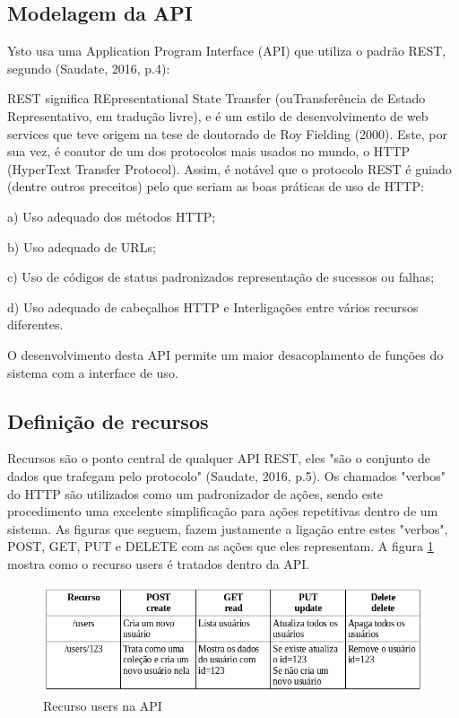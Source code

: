 \subsection{Modelagem da API}
Ysto usa uma Application Program Interface (API) que utiliza o padrão REST, segundo (Saudate, 2016, p.4):

\begin{citacao}
REST significa REpresentational State Transfer (ouTransferência de Estado Representativo, em tradução livre), e é um estilo de desenvolvimento de web services que teve origem na tese de doutorado de Roy Fielding (2000). Este, por sua vez, é coautor de um dos protocolos mais usados no mundo, o HTTP (HyperText Transfer Protocol). Assim, é notável que o protocolo REST é guiado (dentre outros preceitos) pelo que seriam as boas práticas de uso de HTTP:

a) Uso adequado dos métodos HTTP;

b) Uso adequado de URLs;

c) Uso de códigos de status padronizados representação de sucessos ou falhas;

d) Uso adequado de cabeçalhos HTTP e Interligações entre vários recursos diferentes.

O desenvolvimento desta API permite um maior desacoplamento de funções do sistema com a interface de uso.
\end{citacao}

\subsection{Definição de recursos}
Recursos são o ponto central de qualquer API REST, eles "são o conjunto de dados que trafegam pelo protocolo" (Saudate, 2016, p.5). Os chamados "verbos" do HTTP são utilizados como um padronizador de ações, sendo este procedimento uma excelente simplificação para ações repetitivas dentro de um sistema. As figuras que seguem, fazem justamente a ligação entre estes "verbos", POST, GET, PUT e DELETE com as ações que eles representam. A figura \ref{recurso-users} mostra como o recurso users é tratados dentro da API.

\begin{figure}[H]
\caption{\label{recurso-users} Recurso users na API}
\includegraphics[scale=0.5]{img/recurso-users.png}
\end{figure}

